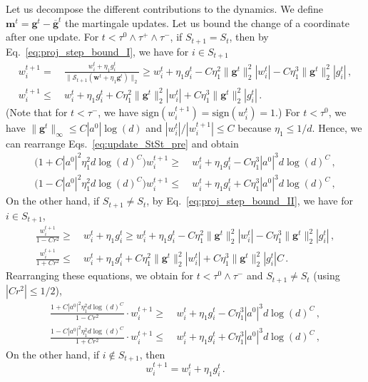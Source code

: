 \documentclass[11pt]{article}
\newcommand{\<}{\langle}
\renewcommand{\>}{\rangle}
\newcommand{\sign}{\text{sign}}
\theoremstyle{definition}
\def\bg{{\boldsymbol g}}
\def\bw{{\boldsymbol w}}
\def\cS{{\mathcal S}}
\def\bg{{\boldsymbol g}}
\def\bw{{\boldsymbol w}}
\def\bg{{\boldsymbol g}}
\def\cS{{\mathcal S}}
\def\bg{{\boldsymbol g}}
\def\obg{\overline{\bg}}
\def\bm{\boldsymbol{m}}
\begin{document}
Let us decompose the different contributions to the dynamics. We define $\bm^t = \bg^t - \obg^t$ the martingale updates. Let us bound the change of a coordinate after one update. For $t < \tau^0 \wedge \tau^+ \wedge \tau^-$, if $S_{t+1} = S_t$, then by Eq.~\eqref{eq:proj_step_bound_I}, we have for $i \in S_{t+1}$
\begin{equation}\label{eq:update_StSt_pre}
\begin{aligned}
w_i^{t+1} =&~ \frac{w_i^t + \eta_1 g_i^t}{\| \cS_{t+1} (\bw^t + \eta_1 \bg^t) \|_2}  \geq w_i^t + \eta_1 g_i^t - C \eta_1^2 \| \bg^t \|_2^2 | w_i^t | - C \eta_1^3 \| \bg^t \|_2^2 | g_i^t| \, ,\\
w_i^{t+1} \leq&~ w_i^t + \eta_1 g_i^t + C \eta_1^2 \| \bg^t \|_2^2 | w_i^t | + C \eta_1^3 \| \bg^t \|_2^2 | g_i^t|  \, .
\end{aligned}
\end{equation}
(Note that for $t < \tau^-$, we have $\sign (w_i^{t+1}) = \sign (w_i^t) = 1$.) 
For $t < \tau^0$, we have $\| \bg^t \|_\infty \leq C |a^0| \log(d)$ and $|w_i^t|/|w_i^{t+1}| \leq C$ because $\eta_1 \leq 1/d$. Hence, we can rearrange Eqs.~\eqref{eq:update_StSt_pre} and obtain
\begin{equation}\label{eq:update_StSt_pre_2}
\begin{aligned}
\big( 1 + C|a^0|^2 \eta_1^2 d \log(d)^{C}  \big) w_i^{t+1} \geq &~ w_i^t + \eta_1g_i^t -  C \eta_1^3 |a^0|^3 d \log(d)^C \, , \\
\big( 1 - C|a^0|^2 \eta_1^2 d \log(d)^{C}  \big) w_i^{t+1} \leq &~ w_i^t + \eta_1g_i^t +  C \eta_1^3 |a^0|^3 d \log(d)^C \, , 
\end{aligned}
\end{equation}
On the other hand, if $S_{t+1} \neq S_t$, by Eq.~\eqref{eq:proj_step_bound_II}, we have for $i \in S_{t+1}$,
\[
\begin{aligned}
\frac{w_i^{t+1}}{1-Cr^2} \geq&~  w_i^t + \eta_1 g_i^t \geq w_i^t + \eta_1 g_i^t - C \eta_1^2 \| \bg^t \|_2^2 | w_i^t | - C \eta_1^3 \| \bg^t \|_2^2 | g_i^t| \, , \\
\frac{w_i^{t+1}}{1+Cr^2} \leq &~ w_i^t + \eta_1 g_i^t + C \eta_1^2 \| \bg^t \|_2^2 | w_i^t | + C  \eta_1^3 \| \bg^t \|_2^2 | g_i^t| C \, .
\end{aligned}
\]
Rearranging these equations, we obtain for $t < \tau^0 \wedge \tau^-$ and $S_{t+1} \neq S_t$ (using $|Cr^2|\leq 1/2$),
\begin{equation}\label{eq:update_StnotSt_pre_2}
\begin{aligned}
\frac{1 + C|a^0|^2 \eta_1^2 d \log(d)^{C}}{1-Cr^2}  \cdot w_i^{t+1} \geq &~ w_i^t + \eta_1g_i^t -  C \eta_1^3 |a^0|^3 d \log(d)^C \, , \\
\frac{ 1 - C|a^0|^2 \eta_1^2 d \log(d)^{C}  }{1+ Cr^2} \cdot w_i^{t+1} \leq &~ w_i^t + \eta_1g_i^t +  C \eta_1^3 |a^0|^3 d \log(d)^C \, , 
\end{aligned}
\end{equation}
On the other hand, if $i \not\in S_{t+1}$, then
\[
w_i^{t+1} = w_i^t + \eta_1 g_i^t \, .
\]
\end{document}
